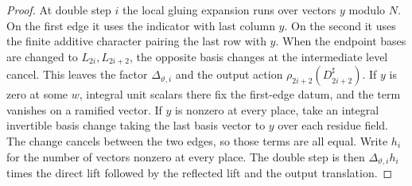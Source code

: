 \begin{proof}
At double step $i$ the local gluing expansion runs over vectors $y$ modulo $N$. On the first edge it uses the indicator with last column $y$. On the second it uses the finite additive character pairing the last row with $y$. When the endpoint bases are changed to $L_{2i},L_{2i+2}$, the opposite basis changes at the intermediate level cancel. This leaves the factor $\Delta_{\vartheta,i}$ and the output action $\rho_{2i+2}(D_{2i+2}^\sharp)$. If $y$ is zero at some $w$, integral unit scalars there fix the first-edge datum, and the term vanishes on a ramified vector. If $y$ is nonzero at every place, take an integral invertible basis change taking the last basis vector to $y$ over each residue field. The change cancels between the two edges, so those terms are all equal. Write $h_i$ for the number of vectors nonzero at every place. The double step is then $\Delta_{\vartheta,i}h_i$ times the direct lift followed by the reflected lift and the output translation.


\end{proof}
